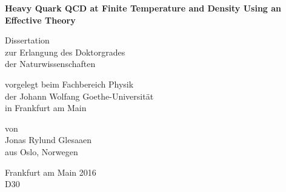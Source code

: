 \begin{titlepage}
  \vspace*{\fill}

  \begin{center} \sffamily\Huge\bfseries
    Heavy Quark QCD at Finite Temperature and Density Using an Effective Theory
  \end{center}

  \vspace*{1cm}

  \begin{center} \sffamily\large
    Dissertation\\
    zur Erlangung des Doktorgrades\\
    der Naturwissenschaften
  \end{center}

  \vspace*{1cm}

  \begin{center} \sffamily\large
    vorgelegt beim Fachbereich Physik\\
    der Johann Wolfang Goethe-Universit\"at\\
    in Frankfurt am Main
  \end{center}

  \vspace*{1cm}

  \begin{center} \sffamily\large
    von\\
    Jonas Rylund Glesaaen\\
    aus Oslo, Norwegen
  \end{center}

  \vspace*{1cm}

  \begin{center} \sffamily\large
    Frankfurt am Main 2016\\
    D30
  \end{center}

  \vspace*{\fill}
\end{titlepage}
